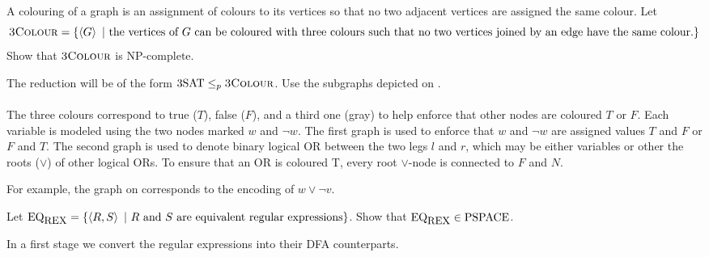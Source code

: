 \documentclass{article}
\begin{document}
\begin{exercise}
A colouring of a graph is an assignment of colours to its vertices so that no two adjacent vertices are assigned the same colour. Let
\begin{equation}
\mbox{\textsc{3Colour}}=\left\{ \left\langle G \right\rangle\ |\ \mbox{the vertices of $G$ can be coloured with three colours such that no two vertices joined by an edge have the same colour.} \right\}
\end{equation}
Show that $\mbox{\textsc{3Colour}}$ is $\mbox{NP-complete}$.
\begin{hint}
The reduction will be of the form $\mbox{3SAT}\leq_p\mbox{\textsc{3Colour}}$. Use the subgraphs depicted on .
\paragraph{}
The three colours correspond to true ($T$), false ($F$), and a third one (gray) to help enforce that other nodes are coloured $T$ or $F$. Each variable is modeled using the two nodes marked $w$ and $\neg w$. The first graph is used to enforce that $w$ and $\neg w$ are assigned values $T$ and $F$ or $F$ and $T$. The second graph is used to denote binary logical OR between the two legs $l$ and $r$, which may be either variables or other the roots ($\vee$) of other logical ORs. To ensure that an OR is coloured T, every root $\vee$-node is connected to $F$ and $N$.
\begin{example}
For example, the graph on  corresponds to the encoding of $w\vee\neg v$.
\end{example}
\end{hint}
\begin{answer}

\end{answer}
\end{exercise}

\begin{exercise}
Let $\mbox{EQ}_{\mbox{\small{REX}}}=\left\{ \left\langle R,S \right\rangle\ |\ \mbox{$R$ and $S$ are equivalent regular expressions} \right\}$. Show that $\mbox{EQ}_{\mbox{\small{REX}}}\in\mbox{PSPACE}$.
\begin{answer}
In a first stage we convert the regular expressions into their DFA counterparts. 
\end{answer}
\end{exercise}
\end{document}
